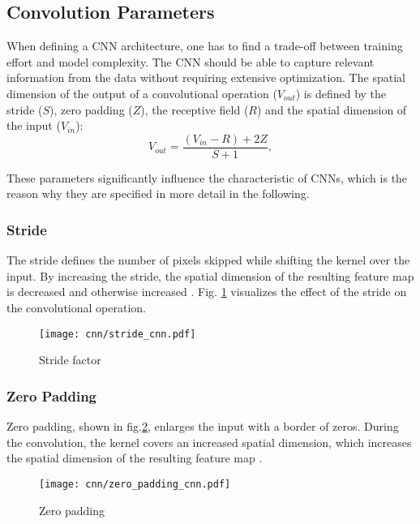 \subsection{Convolution Parameters}
When defining a CNN architecture, one has to find a trade-off between training effort and model complexity. The CNN should be able to capture relevant information from the data without requiring extensive optimization. The spatial dimension of the output of a convolutional operation ($V_{out}$) is defined by the stride ($S$), zero padding ($Z$), the receptive field ($R$) and the spatial dimension of the input ($V_{in}$): 
\begin{equation}
  V_{out} = \frac{(V_{in}-R)+2Z}{S+1}, 
  \label{eq:spatial_dimensionality_cnn_feature map}
\end{equation}

These parameters significantly influence the characteristic of CNNs, which is the reason why they are specified in more detail in the following.

\subsubsection{Stride}
The stride defines the number of pixels skipped while shifting the kernel over the input. By increasing the stride, the spatial dimension of the resulting feature map is decreased and otherwise increased \cite{OShea2015}. Fig. \ref{fig:stride_cnn} visualizes the effect of the stride on the convolutional operation.

\begin{figure}[H]
  \centering
  \texttt{[image: cnn/stride\_cnn.pdf]}
  \caption {Stride factor}
  \label{fig:stride_cnn}
\end{figure}


\subsubsection{Zero Padding}
Zero padding, shown in fig.\ref{fig:zero_padding_cnn}, enlarges the input with a border of zeros. During the convolution, the kernel covers an increased spatial dimension, which increases the spatial dimension of the resulting feature map \cite{OShea2015}.

\begin{figure}[H]
  \centering
  \texttt{[image: cnn/zero\_padding\_cnn.pdf]}
  \caption {Zero padding}
  \label{fig:zero_padding_cnn}
\end{figure}

